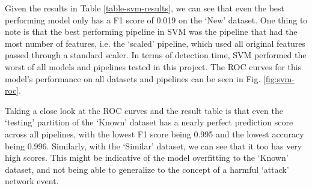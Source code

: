 Given the results in Table \ref{table-svm-results}, we can see that even the best performing model only has a F1 score of 0.019 on the `New' dataset. One thing to note is that the best performing pipeline in SVM was the pipeline that had the most number of features, i.e. the `scaled' pipeline, which used all original features passed through a standard scaler. In terms of detection time, SVM performed the worst of all models and pipelines tested in this project. The ROC curves for this model's performance on all datasets and pipelines can be seen in Fig. \ref{fig:svm-roc}. 

Taking a close look at the ROC curves and the result table is that even the `testing' partition of the `Known' dataset has a nearly perfect prediction score across all pipelines, with the lowest F1 score being 0.995 and the lowest accuracy being 0.996. Similarly, with the `Similar' dataset, we can see that it too has very high scores. This might be indicative of the model overfitting to the `Known' dataset, and not being able to generalize to the concept of a harmful `attack' network event. 

